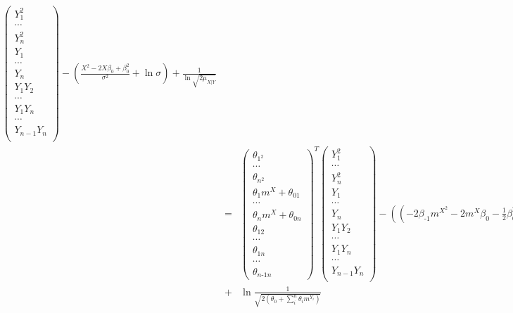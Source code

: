 \documentclass[11pt, oneside]{article}   	%
\numberwithin{figure}{section}
\numberwithin{equation}{section}
\numberwithin{table}{section}
\begin{document}
\begin{itemize}
\begin{eqnarray*}
\begin{pmatrix}
Y_1^2\\
\cdots\\
Y_n^2\\
Y_1\\
\cdots\\
Y_n\\
Y_1 Y_2\\
\cdots\\
Y_1 Y_n\\
\cdots\\
Y_{n-1}Y_{n}\\
\end{pmatrix}
- \left( \frac{X^2 -2X\beta_0 +\beta_0^2}{\sigma^2} + \ln{\sigma} \right) + \frac{1}{\ln{\sqrt{2\mu_{X|Y}}}}\\
&=&
\begin{pmatrix}
\theta_{1^2}\\
\cdots\\
\theta_{n^2}\\
\theta_1 m^X+\theta_{01}\\
\cdots\\
\theta_n m^X+\theta_{0n}\\
\theta_{12}\\
\cdots\\
\theta_{1n}\\
\cdots\\
\theta_{n\mbox{-}1n}
\end{pmatrix}^T
\begin{pmatrix}
Y_1^2\\
\cdots\\
Y_n^2\\
Y_1\\
\cdots\\
Y_n\\
Y_1 Y_2\\
\cdots\\
Y_1 Y_n\\
\cdots\\
Y_{n-1}Y_{n}\\
\end{pmatrix}
- \left( (-2\beta_{\mbox{-}1}m^{X^2} - 2m^{X}\beta_0 - \frac{1}{2}\beta_0^2 \beta_{\mbox{-}1}^{-1}) + \frac{\ln{(2\theta_{\mbox{-}1}})}{2} \right)\\
&+&
\ln{\frac{1}{\sqrt{2(\theta_0+\sum_i^n\theta_i m^{Y_i})}}} 
\end{eqnarray*}

\end{itemize}

\newpage
\end{document}
